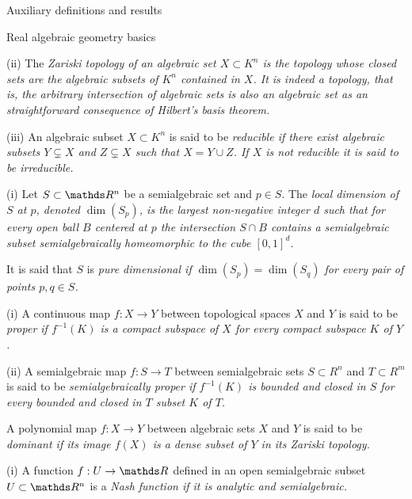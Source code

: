 \documentclass[11pt, a4paper, english, twoside, notitlepage, openright]{report}
\begin{document}
\begin{chapter}{Auxiliary definitions and results}
\begin{section}{Real algebraic geometry basics}
\begin{definition}
(ii) The \em Zariski topology \em of an algebraic set $X\subset K^n$ is the topology whose closed sets are the algebraic subsets of $K^n$ contained in $X$. It is indeed a topology, that is, the arbitrary intersection of algebraic sets is also an algebraic set as an straightforward consequence of Hilbert's basis theorem.

(iii) An algebraic subset $X\subset K^n$ is said to be \em reducible \em if there exist algebraic subsets $Y\subsetneq X$ and  $Z\subsetneq X$ such that $X=Y\cup Z$. If $X$ is not reducible it is said to be  \em irreducible. \em 
\end{definition}

\begin{definition}\label{pureDim} (i) Let $S\subset\R^n$ be a semialgebraic set and $p\in S$. The \em local dimension of $S$ at $p$, \em denoted $\dim(S_p)$, is the largest non-negative integer $d$ such that for every open ball $B$ centered at $p$ the intersection $S\cap B$ contains a semialgebraic subset semialgebraically homeomorphic to the cube $[0,1]^d$.

	It is said that $S$ is \em pure dimensional \em if $\dim(S_p)=\dim(S_q)$ for every pair of points $p,q\in S$.
\end{definition}

\begin{definitions}\label{properMap}
	  (i) A continuous map $f:X\to Y$ between topological spaces $X$ and $Y$ is said to be \em proper \em if $f^{-1}(K)$ is a compact subspace of $X$ for every compact subspace $K$ of $Y$. 
	  
	  (ii) A semialgebraic map $f:S\to T$ between semialgebraic sets $S\subset R^n$ and $T\subset R^m$ is said to be \em semialgebraically proper \em if $f^{-1}(K)$ is bounded and closed in $S$ for every bounded and closed in $T$ subset $K$ of $T$.  
\end{definitions}

\begin{definition}\label{dominant}
	A polynomial map $f:X\to Y$ between algebraic sets $X$ and $Y$ is said to be \em dominant \em if its image $f(X)$ is a dense subset of $Y$ in its Zariski topology. 
\end{definition}

\begin{definitions}\label{curveGerms}
	(i) A function $f:U\to\R$ defined in an open semialgebraic subset $U\subset\R^n$ is a \em Nash function \em if it is analytic and semialgebraic. 
	

\end{definitions}
\end{section}
\end{chapter}
\end{document}
